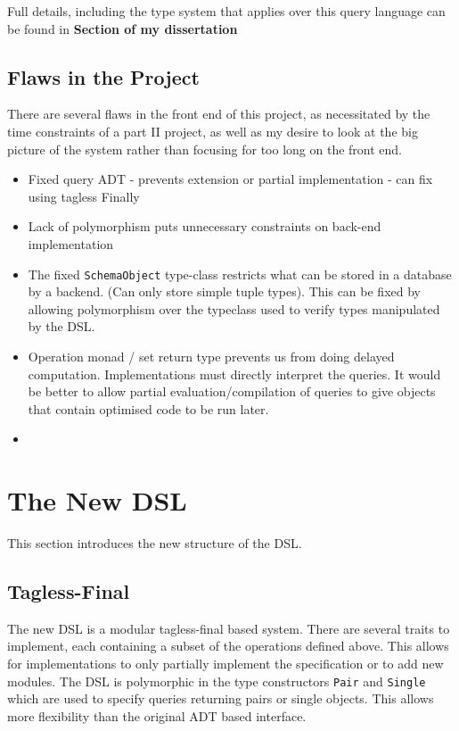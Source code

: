 \documentclass{report}
\newcommand \2[0]{\textbf{2}}
\newcommand \3[0]{\textbf{3}}
\newcommand{\todo}[1]{\textbf{#1}}
\begin{document}
Full details, including the type system that applies over this query language can be found in \todo{Section of my dissertation}
\section{Flaws in the Project}
There are several flaws in the front end of this project, as necessitated by the time constraints of a part II project, as well as my desire to look at the big picture of the system rather than focusing for too long on the front end.

\begin{itemize}
\item Fixed query ADT - prevents extension or partial implementation - can fix using tagless Finally
\item Lack of polymorphism puts unnecessary constraints on back-end implementation
\item The fixed \texttt{SchemaObject} type-class restricts what can be stored in a database by a backend. (Can only store simple tuple types). This can be fixed by allowing polymorphism over the typeclass used to verify types manipulated by the DSL.
\item Operation monad / set return type prevents us from doing delayed computation. Implementations must directly interpret the queries. It would be better to allow partial evaluation/compilation of queries to give objects that contain optimised code to be run later.
\item 
\end{itemize}

\chapter{The New DSL}
This section introduces the new structure of the DSL.
 
\section{Tagless-Final}
The new DSL is a modular tagless-final based system. There are several traits to implement, each containing a subset of the operations defined above. This allows for implementations to only partially implement the specification or to add new modules.
The DSL is polymorphic in the type constructors \texttt{Pair} and \texttt{Single} which are used to specify queries returning pairs or single objects. This allows more flexibility than the original ADT based interface.
\end{document}
